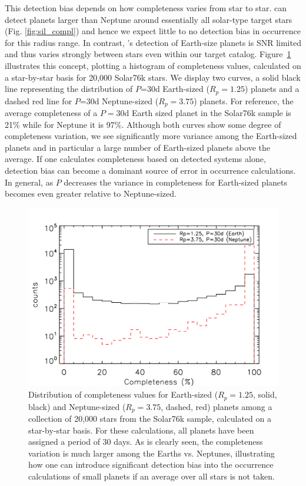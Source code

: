 This detection bias depends on how completeness varies from
star to star.  \kep{} can detect planets larger than Neptune around
essentially all solar-type target stars (Fig. \ref{fig:sil_compl}) and
hence we expect little to no detection bias in occurrence for this radius range.
In contrast, \kep{}'s detection of Earth-size planets is SNR limited and
thus varies strongly between stars even within our target
catalog. Figure~\ref{fig:compvstars} illustrates this concept,
plotting a histogram of completeness values, calculated on a
star-by-star basis for 20,000 Solar76k stars. We display two curves, a
solid black line representing the distribution of $P$=30d Earth-sized
($R_p=1.25$\rearth{}) planets and a dashed red line for $P$=30d
Neptune-sized ($R_p=3.75$\rearth{}) planets. For reference, the
average completeness of a $P=30$d Earth sized planet in the Solar76k sample 
is 21$\%$ while for Neptune it is 97$\%$. Although both curves show some degree of 
completeness variation, we see significantly more variance among the Earth-sized
planets and in particular a large number of Earth-sized planets above the 
average. If one calculates completeness based on detected
systems alone, detection bias can become a dominant source of error in
occurrence calculations.  In general, as $P$ decreases the variance in
completeness for Earth-sized planets becomes even greater relative to
Neptune-sized.

\begin{figure}[h]
\centerline{\includegraphics[scale=0.55]{chap2/Silburt_compvstars.pdf}}
\caption{Distribution of completeness values for Earth-sized
  ($R_p=1.25$\rearth{}, solid, black) and Neptune-sized
  ($R_p=3.75$\rearth{}, dashed, red) planets among a collection of
  20,000 stars from the Solar76k sample, calculated on a star-by-star
  basis. For these calculations, all planets have been assigned a
  period of 30 days. As is clearly seen, the completeness variation is much larger
  among the Earths vs. Neptunes, illustrating how one can introduce
  significant detection bias into the occurrence calculations of small planets if an
  average over all stars is not taken.}
\label{fig:compvstars}
\end{figure}

